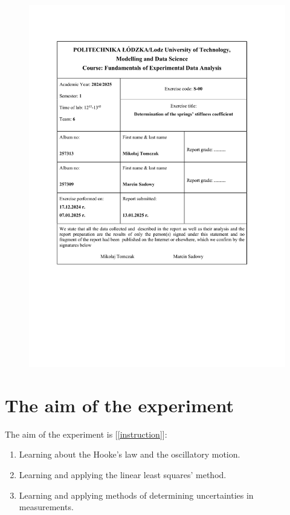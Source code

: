 \documentclass[a4paper,12pt,titlepage,bibliography=numbered]{article}
\begin{document}
\begin{figure}[H]
\centering
\includegraphics[width=1\textwidth]{first_page.pdf}
\end{figure}

\section{The aim of the experiment}

The aim of the experiment is [\ref{instruction}]:
\begin{enumerate}
\item Learning about the Hooke’s law and the oscillatory motion.
\item Learning and applying the linear least squares’ method.
\item Learning and applying methods of determining uncertainties in measurements.
\end{enumerate}
\end{document}
